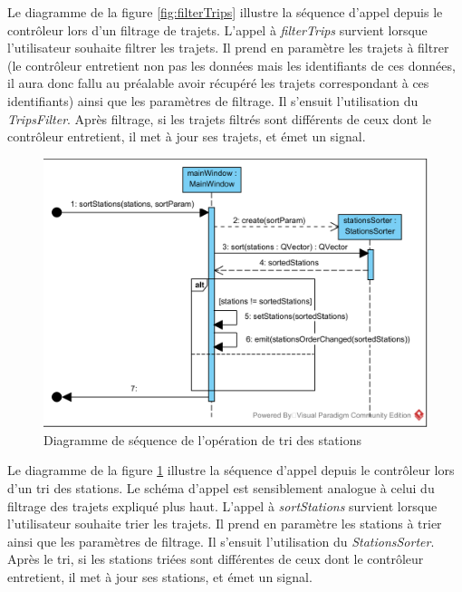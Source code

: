 \documentclass[12pt]{article}
\begin{document}
	Le diagramme de la figure \ref{fig:filterTrips} illustre la séquence d’appel depuis le contrôleur lors d’un filtrage de trajets. L’appel à \textit{filterTrips} survient lorsque l’utilisateur souhaite filtrer les trajets. Il prend en paramètre les trajets à filtrer (le contrôleur entretient non pas les données mais les identifiants de ces données, il aura donc fallu au préalable avoir récupéré les trajets correspondant à ces identifiants) ainsi que les paramètres de filtrage. Il s’ensuit l’utilisation du \textit{TripsFilter}. Après filtrage, si les trajets filtrés sont différents de ceux dont le contrôleur entretient, il met à jour ses trajets, et émet un signal.\\
	
	\begin{figure}[!h]
	\begin{center}
	\includegraphics[scale=1]{dia_sequence_sortStations.png}
	\caption{Diagramme de séquence de l’opération de tri des stations}
	\label{fig:sortStations}
	\end{center}
	\end{figure}
	
	Le diagramme de la figure \ref{fig:sortStations} illustre la séquence d’appel depuis le contrôleur lors d’un tri des stations. Le schéma d’appel est sensiblement analogue à celui du filtrage des trajets expliqué plus haut. L’appel à \textit{sortStations} survient lorsque l’utilisateur souhaite trier les trajets. Il prend en paramètre les stations à trier ainsi que les paramètres de filtrage. Il s’ensuit l’utilisation du \textit{StationsSorter}. Après le tri, si les stations triées sont différentes de ceux dont le contrôleur entretient, il met à jour ses stations, et émet un signal.\\
	
\end{document}
